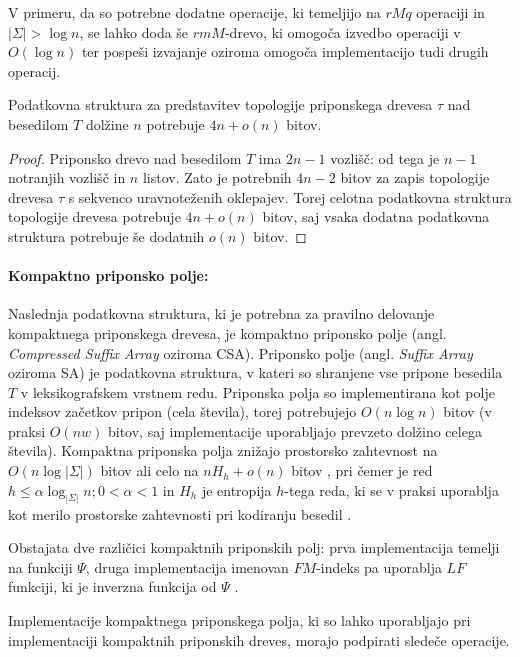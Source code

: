 V primeru, da so potrebne dodatne operacije, ki temeljijo na $rMq$ operaciji in $|\Sigma|>\log{n}$, se lahko doda še $rmM$-drevo, ki omogoča izvedbo operaciji v $O(\log{n})$ ter pospeši izvajanje oziroma omogoča implementacijo tudi drugih operacij.

\begin{lema}\label{lema:BP}
 Podatkovna struktura za predstavitev topologije priponskega drevesa $\tau$ nad besedilom $T$ dolžine $n$ potrebuje $4n+o(n)$ bitov.
\end{lema}

\begin{proof}
Priponsko drevo nad besedilom $T$ ima $2n-1$ vozlišč: od tega je $n-1$ notranjih vozlišč in $n$ listov. Zato je potrebnih $4n-2$ bitov za zapis topologije drevesa $\tau$ s sekvenco uravnoteženih oklepajev. Torej celotna podatkovna struktura topologije drevesa potrebuje $4n+o(n)$ bitov, saj vsaka dodatna podatkovna struktura potrebuje še dodatnih $o(n)$ bitov.
\end{proof}

\paragraph{Kompaktno priponsko polje:}
Naslednja podatkovna struktura, ki je potrebna za pravilno delovanje kompaktnega priponskega drevesa, je kompaktno priponsko polje (angl. \textit{Compressed Suffix Array} oziroma CSA). Priponsko polje (angl. \textit{Suffix Array} oziroma SA) je podatkovna struktura, v kateri so shranjene vse pripone besedila $T$ v leksikografskem vrstnem redu. Priponska polja so implementirana kot polje indeksov začetkov pripon (cela števila), torej potrebujejo $O(n\log{n})$ bitov (v praksi $O(nw)$ bitov, saj implementacije uporabljajo prevzeto dolžino celega števila). Kompaktna priponska polja znižajo prostorsko zahtevnost na $O(n\log{|\Sigma|})$ bitov \cite{Grossi2000} ali celo na $nH_h +o(n)$ bitov \cite{Grossi2003}, pri čemer je red $h\le\alpha\log_{|\Sigma|}{n};0<\alpha<1$ in $H_h$ je entropija $h$-tega reda, ki se v praksi uporablja kot merilo prostorske zahtevnosti pri kodiranju besedil \cite{Navarro2016}.

Obstajata dve različici kompaktnih priponskih polj: prva implementacija temelji na funkciji $\Psi$, druga implementacija imenovan $FM$-indeks pa uporablja $LF$ funkciji, ki je inverzna funkcija od $\Psi$ \cite{Navarro2016, Sadakane2007}.

Implementacije kompaktnega priponskega polja, ki so lahko uporabljajo pri implementaciji kompaktnih priponskih dreves, morajo podpirati sledeče operacije.


